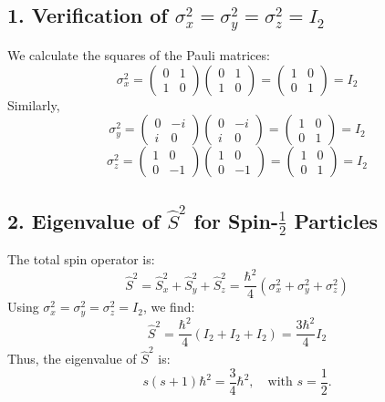 \documentclass[a4paper,12pt]{article}
\begin{document}
\begin{multicols}{2}
\subsection*{1. Verification of $\sigma_x^2 = \sigma_y^2 = \sigma_z^2 = I_2$}
We calculate the squares of the Pauli matrices:
\[
\sigma_x^2 = \begin{pmatrix} 0 & 1 \\ 1 & 0 \end{pmatrix} \begin{pmatrix} 0 & 1 \\ 1 & 0 \end{pmatrix} = \begin{pmatrix} 1 & 0 \\ 0 & 1 \end{pmatrix} = I_2
\]
Similarly,
\[
\sigma_y^2 = \begin{pmatrix} 0 & -i \\ i & 0 \end{pmatrix} \begin{pmatrix} 0 & -i \\ i & 0 \end{pmatrix} = \begin{pmatrix} 1 & 0 \\ 0 & 1 \end{pmatrix} = I_2
\]
\[
\sigma_z^2 = \begin{pmatrix} 1 & 0 \\ 0 & -1 \end{pmatrix} \begin{pmatrix} 1 & 0 \\ 0 & -1 \end{pmatrix} = \begin{pmatrix} 1 & 0 \\ 0 & 1 \end{pmatrix} = I_2
\]

\subsection*{2. Eigenvalue of $\hat{S}^2$ for Spin-$\frac{1}{2}$ Particles}
The total spin operator is:
\[
\hat{S}^2 = \hat{S}_x^2 + \hat{S}_y^2 + \hat{S}_z^2 = \frac{\hbar^2}{4}(\sigma_x^2 + \sigma_y^2 + \sigma_z^2)
\]
Using $\sigma_x^2 = \sigma_y^2 = \sigma_z^2 = I_2$, we find:
\[
\hat{S}^2 = \frac{\hbar^2}{4}(I_2 + I_2 + I_2) = \frac{3\hbar^2}{4}I_2
\]
Thus, the eigenvalue of $\hat{S}^2$ is:
\[
s(s+1)\hbar^2 = \frac{3}{4}\hbar^2, \quad \text{with } s = \frac{1}{2}.
\]


\end{multicols}
\end{document}
